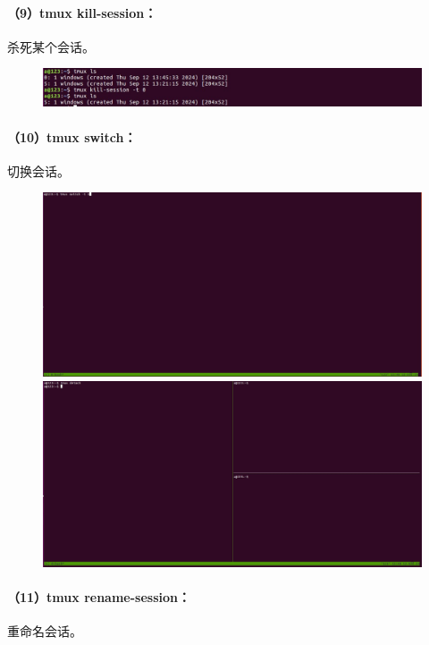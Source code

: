 \documentclass[a4paper, 12pt]{article}
\begin{document}
	\paragraph{（9）tmux kill-session：}
	杀死某个会话。	
	
	\begin{figure}[H]
		\centering
		\includegraphics[width=1\textwidth]{023.jpg}
	\end{figure}
	
	\paragraph{（10）tmux switch：}
	切换会话。	
	
	\begin{figure}[H]
		\centering
		\includegraphics[width=1\textwidth]{024.jpg}
		\includegraphics[width=1\textwidth]{025.jpg}
	\end{figure}
	
	\paragraph{（11）tmux rename-session：}
	重命名会话。	
	
\end{document}
